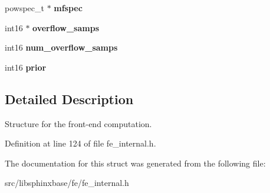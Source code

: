 \begin{CompactItemize}
\item 
powspec\_\-t $\ast$ \textbf{mfspec}\label{structfe__s_87fd448109884fc3d796b926b67697e7}

\item 
int16 $\ast$ \textbf{overflow\_\-samps}\label{structfe__s_7975216c6a540fa498352736404797b1}

\item 
int16 \textbf{num\_\-overflow\_\-samps}\label{structfe__s_c22fe7c117ef00eb513d7d0771333ddd}

\item 
int16 \textbf{prior}\label{structfe__s_e6af635a19dac6426bf882a3fc5b069b}

\end{CompactItemize}


\subsection{Detailed Description}
Structure for the front-end computation. 



Definition at line 124 of file fe\_\-internal.h.

The documentation for this struct was generated from the following file:\begin{CompactItemize}
\item 
src/libsphinxbase/fe/fe\_\-internal.h\end{CompactItemize}
